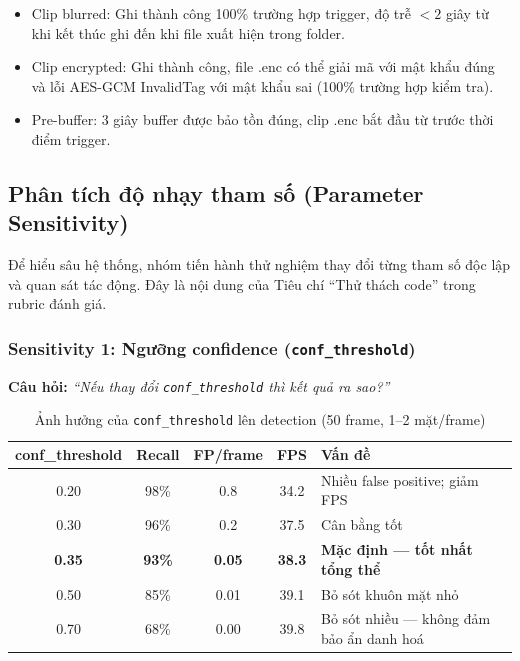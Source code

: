 \begin{itemize}
    \item Clip blurred: Ghi thành công 100\% trường hợp trigger, độ trễ $< 2$ giây từ khi kết thúc ghi đến khi file xuất hiện trong folder.
    \item Clip encrypted: Ghi thành công, file .enc có thể giải mã với mật khẩu đúng và lỗi AES-GCM InvalidTag với mật khẩu sai (100\% trường hợp kiểm tra).
    \item Pre-buffer: 3 giây buffer được bảo tồn đúng, clip .enc bắt đầu từ trước thời điểm trigger.
\end{itemize}

\subsection{Phân tích độ nhạy tham số (Parameter Sensitivity)}
\label{subsec:sensitivity}

Để hiểu sâu hệ thống, nhóm tiến hành thử nghiệm thay đổi từng tham số độc lập và quan sát tác động. Đây là nội dung của Tiêu chí ``Thử thách code'' trong rubric đánh giá.

\subsubsection{Sensitivity 1: Ngưỡng confidence (\texttt{conf\_threshold})}
\label{subsubsec:sens_conf}

\textbf{Câu hỏi:} \textit{``Nếu thay đổi \texttt{conf\_threshold} thì kết quả ra sao?''}

\begin{table}[H]
\centering
\caption{Ảnh hưởng của \texttt{conf\_threshold} lên detection (50 frame, 1--2 mặt/frame)}
\label{tab:sens_conf}
\begin{tabular}{|c|c|c|c|l|}
\hline
\textbf{conf\_threshold} & \textbf{Recall} & \textbf{FP/frame} & \textbf{FPS} & \textbf{Vấn đề} \\
\hline
0.20 & 98\% & 0.8 & 34.2 & Nhiều false positive; giảm FPS \\
0.30 & 96\% & 0.2 & 37.5 & Cân bằng tốt \\
\textbf{0.35} & \textbf{93\%} & \textbf{0.05} & \textbf{38.3} & \textbf{Mặc định --- tốt nhất tổng thể} \\
0.50 & 85\% & 0.01 & 39.1 & Bỏ sót khuôn mặt nhỏ \\
0.70 & 68\% & 0.00 & 39.8 & Bỏ sót nhiều --- không đảm bảo ẩn danh hoá \\
\hline
\end{tabular}
\end{table}

